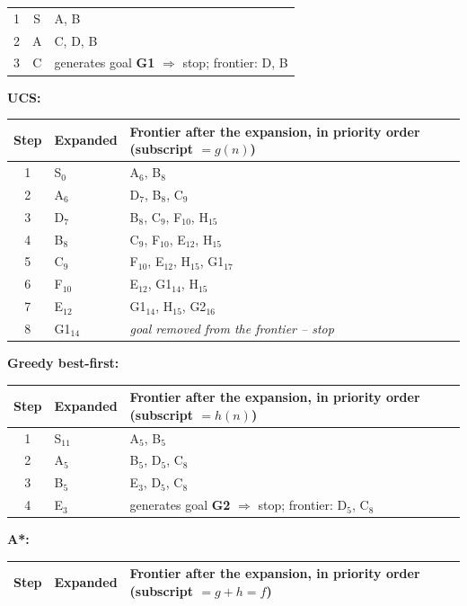 \documentclass[11pt,a4paper]{article}
\begin{document}
\begin{solbox}
\begin{center}
\begin{tabularx}{\linewidth}{c c >{\raggedright\arraybackslash}X}
1 & S & A, B \\
2 & A & C, D, B \\
3 & C & generates goal \textbf{G1} $\Rightarrow$ stop; frontier: D, B \\
\bottomrule\end{tabularx}\end{center}\textbf{UCS:}\begin{center}\small\begin{tabularx}{\linewidth}{c l >{\raggedright\arraybackslash}X}\toprule
Step & Expanded & Frontier after the expansion, in priority order (subscript $=g(n)$) \\ \midrule
1 & S$_{0}$ & A$_{6}$, B$_{8}$ \\
2 & A$_{6}$ & D$_{7}$, B$_{8}$, C$_{9}$ \\
3 & D$_{7}$ & B$_{8}$, C$_{9}$, F$_{10}$, H$_{15}$ \\
4 & B$_{8}$ & C$_{9}$, F$_{10}$, E$_{12}$, H$_{15}$ \\
5 & C$_{9}$ & F$_{10}$, E$_{12}$, H$_{15}$, G1$_{17}$ \\
6 & F$_{10}$ & E$_{12}$, G1$_{14}$, H$_{15}$ \\
7 & E$_{12}$ & G1$_{14}$, H$_{15}$, G2$_{16}$ \\
8 & G1$_{14}$ & \textit{goal removed from the frontier -- stop} \\
\bottomrule\end{tabularx}\end{center}\textbf{Greedy best-first:}\begin{center}\small\begin{tabularx}{\linewidth}{c l >{\raggedright\arraybackslash}X}\toprule
Step & Expanded & Frontier after the expansion, in priority order (subscript $=h(n)$) \\ \midrule
1 & S$_{11}$ & A$_{5}$, B$_{5}$ \\
2 & A$_{5}$ & B$_{5}$, D$_{5}$, C$_{8}$ \\
3 & B$_{5}$ & E$_{3}$, D$_{5}$, C$_{8}$ \\
4 & E$_{3}$ & generates goal \textbf{G2} $\Rightarrow$ stop; frontier: D$_{5}$, C$_{8}$ \\
\bottomrule\end{tabularx}\end{center}\textbf{A*:}\begin{center}\small\begin{tabularx}{\linewidth}{c l >{\raggedright\arraybackslash}X}\toprule
Step & Expanded & Frontier after the expansion, in priority order (subscript $=g+h=f$) \\ \midrule

\end{tabularx}
\end{center}
\end{solbox}
\end{document}
